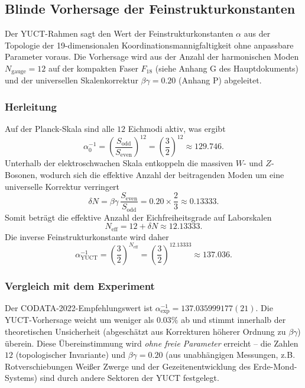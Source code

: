 \documentclass[12pt,a4paper]{article}
\theoremstyle{remark}
\begin{document}
	\subsection{Blinde Vorhersage der Feinstrukturkonstanten}
	\label{subsec:blind_alpha}
	
	Der YUCT-Rahmen sagt den Wert der Feinstrukturkonstanten $\alpha$ aus der Topologie der 19-dimensionalen Koordinationsmannigfaltigkeit ohne anpassbare Parameter voraus. Die Vorhersage wird aus der Anzahl der harmonischen Moden $N_{\mathrm{gauge}} = 12$ auf der kompakten Faser $F_{18}$ (siehe Anhang G des Hauptdokuments) und der universellen Skalenkorrektur $\beta\gamma = 0.20$ (Anhang P) abgeleitet.
	
	\subsubsection{Herleitung}
	
	Auf der Planck-Skala sind alle $12$ Eichmodi aktiv, was ergibt
	\[
	\alpha_0^{-1} = \left(\frac{S_{\mathrm{odd}}}{S_{\mathrm{even}}}\right)^{12}
	= \left(\frac{3}{2}\right)^{12} \approx 129.746 .
	\]
	Unterhalb der elektroschwachen Skala entkoppeln die massiven $W$- und $Z$-Bosonen, wodurch sich die effektive Anzahl der beitragenden Moden um eine universelle Korrektur verringert
	\[
	\delta N = \beta\gamma \, \frac{S_{\mathrm{even}}}{S_{\mathrm{odd}}}
	= 0.20 \times \frac{2}{3} \approx 0.13333 .
	\]
	Somit beträgt die effektive Anzahl der Eichfreiheitsgrade auf Laborskalen
	\[
	N_{\mathrm{eff}} = 12 + \delta N \approx 12.13333 .
	\]
	Die inverse Feinstrukturkonstante wird daher
	\[
	\boxed{\alpha^{-1}_{\mathrm{YUCT}} = \left(\frac{3}{2}\right)^{N_{\mathrm{eff}}}
		= \left(\frac{3}{2}\right)^{12.13333} \approx 137.036 } .
	\]
	
	\subsubsection{Vergleich mit dem Experiment}
	
	Der CODATA-2022-Empfehlungswert ist $\alpha^{-1}_{\mathrm{exp}} = 137.035999177(21)$. Die YUCT-Vorhersage weicht um weniger als $0.03\%$ ab und stimmt innerhalb der theoretischen Unsicherheit (abgeschätzt aus Korrekturen höherer Ordnung zu $\beta\gamma$) überein. Diese Übereinstimmung wird \emph{ohne freie Parameter} erreicht – die Zahlen $12$ (topologischer Invariante) und $\beta\gamma=0.20$ (aus unabhängigen Messungen, z.B. Rotverschiebungen Weißer Zwerge und der Gezeitenentwicklung des Erde-Mond-Systems) sind durch andere Sektoren der YUCT festgelegt.
	
\end{document}
